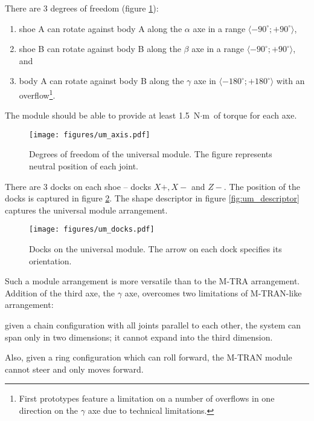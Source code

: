 There are 3 degrees of freedom (figure \ref{fig:um_axis}):
\begin{enumerate}
    \item shoe A can rotate against body A along the $\alpha$ axe in a range
    $\langle -90^\circ; +90^\circ\rangle$,
    \item shoe B can rotate against body B along the $\beta$ axe in a range
    $\langle -90^\circ; +90^\circ\rangle$, and
    \item body A can rotate against body B along the $\gamma$ axe in $\langle
    -180^\circ; +180^\circ\rangle$ with an overflow\footnote{First prototypes
    feature a limitation on a number of overflows in one direction on the
    $\gamma$ axe due to technical limitations. }.
\end{enumerate}
The module should be able to provide at least 1.5 $\text{N}\cdot\text{m}$ of
torque for each axe.

\begin{figure}
    \centering
    \texttt{[image: figures/um\_axis.pdf]}
    \caption{Degrees of freedom of the universal module. The figure represents neutral position of each joint.}
    \label{fig:um_axis}
\end{figure}

There are 3 docks on each shoe -- docks $X+, X-$ and $Z-$. The position of the
docks is captured in figure \ref{fig:um_docks}. The shape descriptor in figure
\ref{fig:um_descriptor} captures the universal module arrangement.

\begin{figure}
    \centering
    \texttt{[image: figures/um\_docks.pdf]}
    \caption{Docks on the universal module. The arrow on each dock specifies its orientation.}
    \label{fig:um_docks}
\end{figure}

Such a module arrangement is more versatile than to the M-TRA arrangement.
Addition of the third axe, the $\gamma$ axe, overcomes two limitations of
M-TRAN-like arrangement:
\begin{enumerate*}
    \item given a chain configuration with all joints parallel to each other,
    the system can span only in two dimensions; it cannot expand into the third
    dimension.
    \item Also, given a ring configuration which can roll forward, the M-TRAN
    module cannot steer and only moves forward.
\end{enumerate*}


